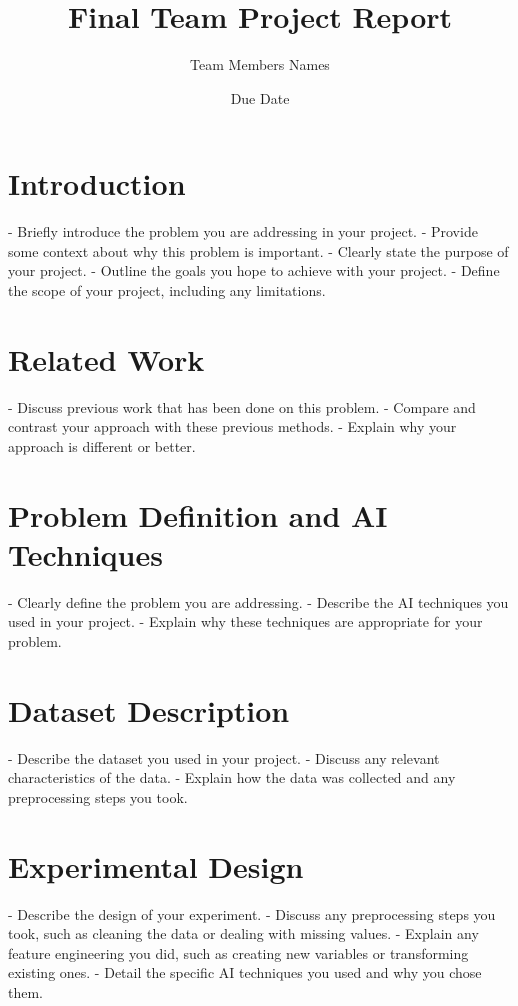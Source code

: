 \documentclass{article}
\title{Final Team Project Report}
\author{Team Members Names}
\date{Due Date}
\begin{document}


\maketitle

\section{Introduction}

\label{sec:introduction}
- Briefly introduce the problem you are addressing in your project.
- Provide some context about why this problem is important.
- Clearly state the purpose of your project.
- Outline the goals you hope to achieve with your project.
- Define the scope of your project, including any limitations.

\section{Related Work}
\label{sec:related_work}
- Discuss previous work that has been done on this problem.
- Compare and contrast your approach with these previous methods.
- Explain why your approach is different or better.

\section{Problem Definition and AI Techniques}
\label{sec:problem_definition_and_ai_techniques}
- Clearly define the problem you are addressing.
- Describe the AI techniques you used in your project.
- Explain why these techniques are appropriate for your problem.

\section{Dataset Description}
\label{sec:dataset_description}
- Describe the dataset you used in your project.
- Discuss any relevant characteristics of the data.
- Explain how the data was collected and any preprocessing steps you took.

\section{Experimental Design}
\label{sec:experimental_design}
- Describe the design of your experiment.
- Discuss any preprocessing steps you took, such as cleaning the data or
dealing with missing values.
- Explain any feature engineering you did, such as creating new variables or
transforming existing ones.
- Detail the specific AI techniques you used and why you chose them.
\end{document}
